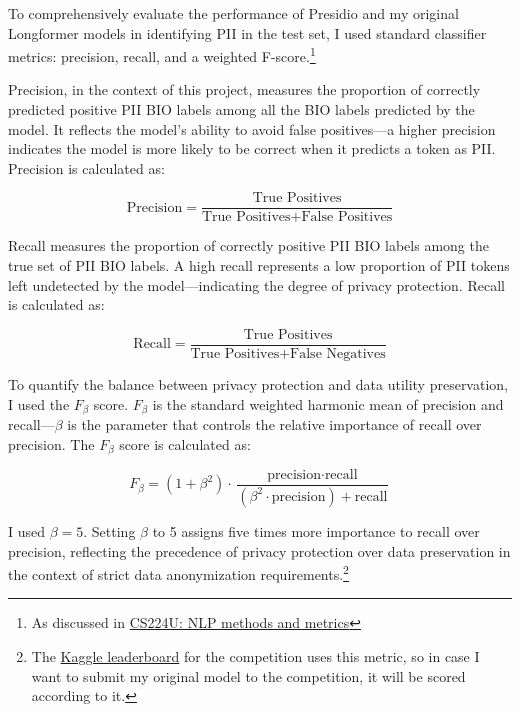 \documentclass[11pt]{article}
\begin{document}
To comprehensively evaluate the performance of Presidio and my original Longformer models in identifying PII in the test set, I used standard classifier metrics: precision, recall, and a weighted F-score.\footnote{As discussed in \href{https://web.stanford.edu/class/cs224u/slides/cs224u-methods-2023-handout.pdf}{CS224U: NLP methods and metrics}}

Precision, in the context of this project, measures the proportion of correctly predicted positive PII BIO labels among all the BIO labels predicted by the model. It reflects the model's ability to avoid false positives—a higher precision indicates the model is more likely to be correct when it predicts a token as PII. Precision is calculated as:

\begin{equation*}
\text{Precision} = \frac{\text{True Positives}}{\text{True Positives} + \text{False Positives}}
\end{equation*}

Recall measures the proportion of correctly positive PII BIO labels among the true set of PII BIO labels. A high recall represents a low proportion of PII tokens left undetected by the model—indicating the degree of privacy protection. Recall is calculated as:

\begin{equation*}
\text{Recall} = \frac{\text{True Positives}}{\text{True Positives} + \text{False Negatives}}
\end{equation*}

To quantify the balance between privacy protection and data utility preservation, I used the $F_\beta$ score. $F_\beta$ is the standard weighted harmonic mean of precision and recall—$\beta$ is the parameter that controls the relative importance of recall over precision. The $F_\beta$ score is calculated as:

\begin{equation*}
F_\beta = (1 + \beta^2) \cdot \frac{\text{precision} \cdot \text{recall}}{(\beta^2 \cdot \text{precision}) + \text{recall}}
\end{equation*}
 
I used $\beta=5$. Setting $\beta$ to 5 assigns five times more importance to recall over precision, reflecting the precedence of privacy protection over data preservation in the context of strict data anonymization requirements.\footnote{The \href{https://www.kaggle.com/competitions/pii-detection-removal-from-educational-data/leaderboard}{Kaggle leaderboard} for the competition uses this metric, so in case I want to submit my original model to the competition, it will be scored according to it.} 
\end{document}
